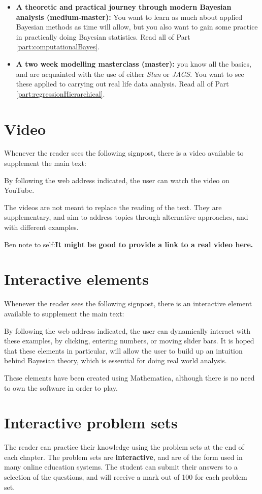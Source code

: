\documentclass[11pt,fullpage]{book}
\begin{document}
\begin{itemize}
\item \textbf{A theoretic and practical journey through modern Bayesian analysis (medium-master):} You want to learn as much about applied Bayesian methods as time will allow, but you also want to gain some practice in practically doing Bayesian statistics. Read all of Part \ref{part:computationalBayes}.
\item \textbf{A two week modelling masterclass (master):} you know all the basics, and are acquainted with the use of either \textit{Stan} or \textit{JAGS\BUGS}. You want to see these applied to carrying out real life data analysis. Read all of Part \ref{part:regressionHierarchical}. 
\end{itemize}

\section{Video}
Whenever the reader sees the following signpost, there is a video available to supplement the main text:


By following the web address indicated, the user can watch the video on YouTube.

The videos are not meant to replace the reading of the text. They are supplementary, and aim to address topics through alternative approaches, and with different examples.

Ben note to self:\textbf{It might be good to provide a link to a real video here.}

\section{Interactive elements}
Whenever the reader sees the following signpost, there is an interactive element available to supplement the main text:


By following the web address indicated, the user can dynamically interact with these examples, by clicking, entering numbers, or moving slider bars. It is hoped that these elements in particular, will allow the user to build up an intuition behind Bayesian theory, which is essential for doing real world analysis.

These elements have been created using Mathematica, although there is no need to own the software in order to play. 

\section{Interactive problem sets}
The reader can practice their knowledge using the problem sets at the end of each chapter. The problem sets are \textbf{interactive}, and are of the form used in many online education systems. The student can submit their answers to a selection of the questions, and will receive a mark out of 100 for each problem set.
\end{document}
